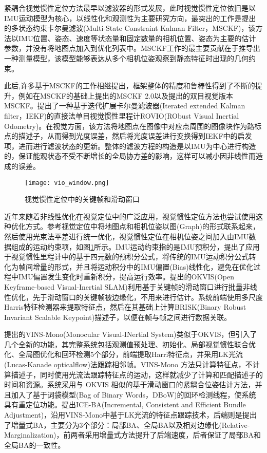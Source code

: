 紧耦合视觉惯性定位方法最早以滤波器的形式发展，此时视觉惯性定位依旧是以IMU运动模型为核心，以线性化和观测性为主要研究方向，最突出的工作是\citet{mourikis2007multi}提出的多状态约束卡尔曼滤波(Multi-State Constraint Kalman Filter，MSCKF)，该方法以IMU位置、姿态、速度等状态量和固定数量的相机位置、姿态为主要的估计参数，并没有将地图点加入到优化列表中。MSCKF工作的最主要贡献在于推导出一种测量模型，该模型能够表达从多个相机位姿观察到静态特征时出现的几何约束。

此后,许多基于MSCKF的工作相继提出，框架整体的精度和鲁棒性得到了不断的提升，例如\citet{li2013high}在MSCKF的基础上提出的MSCKF 2.0以及\citet{sun2018robust}提出的双目视觉版本MSCKF。\citet{bloesch2017iterated}提出了一种基于迭代扩展卡尔曼滤波器(Iterated extended Kalman filter，IEKF)的直接法单目视觉惯性里程计ROVIO(RObust Visual Inertial Odometry)。在视觉方面，该方法将地图点在图像中对应点周围的图像块作为路标点的描述子，从而得到光度误差，然后将光度误差进行变换得到IEKF中的启发项，进而进行滤波状态的更新。整体的滤波方程的构造是以IMU为中心进行构造的，保证能观状态不受不断增长的全局协方差的影响，这样可以减小因非线性而造成的误差。

\begin{figure}
  \centering
  \texttt{[image: vio\_window.png]}
  \caption{视觉惯性定位中的关键帧和滑动窗口}
  \label{fig:vio_window}
\end{figure}

近年来随着非线性优化在视觉定位中的广泛应用，视觉惯性定位方法也尝试使用这种优化方式。参考视觉定位中将地图点和相机位姿以图(Graph)的形式联系起来，然后使用光束法平差进行统一优化，视觉惯性定位在相机位姿之间加入由IMU数据组成的运动约束项，如图\ref{fig:vio_window}所示。IMU运动约束指的是IMU预积分，\citet{forster2016manifold}提出了应用于视觉惯性里程计中的基于四元数的预积分公式，将传统的IMU运动积分公式转化为帧间增量的形式，并且将运动积分中的IMU偏置(Bias)线性化，避免在优化过程中IMU偏置发生变化时重新积分，提高运行效率。\citet{leutenegger2015keyframe}提出的OKVIS(Open Keyframe-based Visual-Inertial SLAM)利用基于关键帧的滑动窗口进行批量非线性优化，先于滑动窗口的关键帧被边缘化，不用来进行估计。系统前端使用多尺度Harris\cite{harris1988combined}特征检测器来提取特征点，然后在其基础上计算BRISK(Binary Robust Invariant Scalable Keypoint)\cite{leutenegger2011brisk}描述子，以便在帧与帧之间进行数据关联。

\citet{qin2018vins}提出的VINS-Mono(Monocular Visual-INertial System)类似于OKVIS，但引入了几个全新的功能，其完整系统包括观测值预处理、初始化、局部视觉惯性联合优化、全局图优化和回环检测5个部分，前端提取Harri特征点，并采用LK光流(Lucas-Kanade opticalflow)\cite{lucas1981iterative}法跟踪相邻帧。VINS-Mono 方法只计算特征点，不计算描述子，同时使用光流法跟踪特征点的运动，这样就减少了计算和匹配描述子的时间和资源。系统采用与 OKVIS 相似的基于滑动窗口的紧耦合位姿估计方法，并且加入了基于词袋模型(Bag of Binary Words，DBoW)\cite{galvez2012bags}的回环检测线程，使系统具有重定位功能。\citet{liu2018ice}提出ICE-BA(Incremental, Consistent and Efficient Bundle Adjustment)，沿用VINS-Mono中基于LK光流的特征点跟踪技术，后端则是提出了增量式BA，主要分为3个部分：局部BA、全局BA以及相对边缘化(Relative-Marginalization)，前两者采用增量式方法提升了后端速度，后者保证了局部BA和全局BA的一致性。

